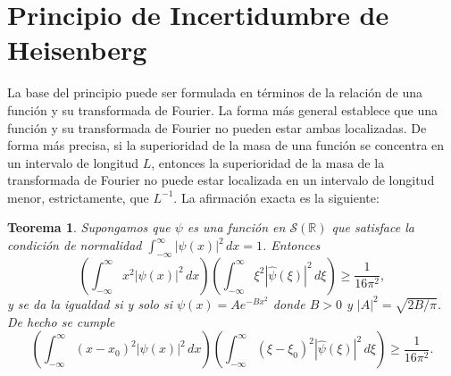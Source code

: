 \documentclass[12pt]{article}
\newcommand{\Sc}{\mathcal{S}(\mathbb{R})}
\theoremstyle{plain}
\newtheorem{teorema}{Teorema}[section] %
\theoremstyle{definition}
\numberwithin{equation}{section}
\begin{document}
    \section{Principio de Incertidumbre de Heisenberg}
        La base del principio puede ser formulada en términos de la relación de una función y su transformada de Fourier. La forma más general establece que una función y su transformada de Fourier no pueden estar ambas localizadas. De forma más precisa, si la superioridad de la masa de una función se concentra en un intervalo de longitud \(L\), entonces la superioridad de la masa de la transformada de Fourier no puede estar localizada en un intervalo de longitud menor, estrictamente, que \(L^{-1}\). La afirmación exacta es la siguiente:
        \begin{teorema}
            Supongamos que \(\psi\) es una función en \(\Sc\) que satisface la condición de normalidad \(\int_{-\infty}^{\infty} \left\lvert \psi(x) \right\rvert^2 \,dx = 1\). Entonces
            \begin{equation*}
                \left( \int_{-\infty}^{\infty} x^2 \left\lvert \psi(x) \right\rvert^2 \,dx \right) \left( \int_{-\infty}^{\infty} \xi^2 \left\lvert \hat{\psi}(\xi) \right\rvert^2 \,d\xi \right) \ge \frac{1}{16\pi^2},
            \end{equation*}
            y se da la igualdad si y solo si \(\psi(x) = Ae^{-Bx^2}\) donde \(B > 0\) y \(\left\lvert A\right\rvert ^2 = \sqrt{2B/\pi}\). 
            De hecho se cumple
            \begin{equation*}
                \left( \int_{-\infty}^{\infty} (x-x_0)^2 \left\lvert \psi(x) \right\rvert^2 \,dx \right) \left( \int_{-\infty}^{\infty} (\xi-\xi_0)^2 \left\lvert \hat{\psi}(\xi) \right\rvert^2 \,d\xi \right) \ge \frac{1}{16\pi^2}.
            \end{equation*}
        \end{teorema}
\end{document}
